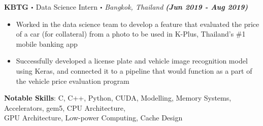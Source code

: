 \documentclass[10pt]{article}
\newcommand\sbullet[1][.5]{\mathbin{\vcenter{\hbox{\scalebox{#1}{$\bullet$}}}}}
\begin{document}
\textbf{\large KBTG $\sbullet$} {\large Data Science Intern $\sbullet$ \textit{Bangkok, Thailand}} {\hfill \textit{\textbf{(Jun 2019 - Aug 2019)}}}

  \vspace*{-0.2cm}
  \begin{itemize}
    \itemsep-0.4em
    \item \textcolor{lighterG}{Worked in the data science team to develop a feature that evaluated the price of a car (for collateral) from a photo to be used in K-Plus, Thailand's \#1 mobile banking app}
    \item \textcolor{lighterG}{Successfully developed a license plate and vehicle image recognition model using Keras, and connected it to a pipeline that would function as a part of the vehicle price evaluation program}
  \end{itemize}

  \vspace{0.2cm}
  \textbf{\large{Notable Skills}}: C, C++, Python, CUDA, Modelling, Memory Systems, Accelerators, gem5, CPU Architecture, \\ GPU Architecture, Low-power Computing, Cache Design
\end{document}
